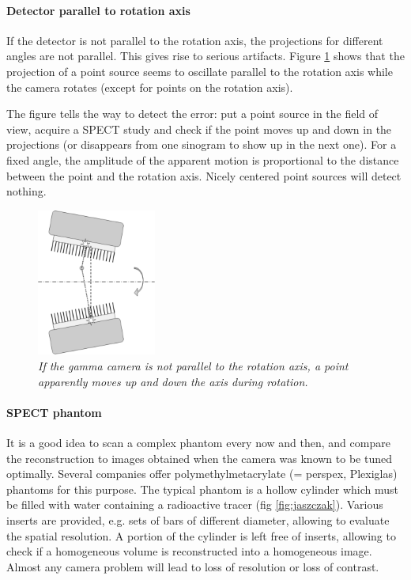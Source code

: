 \documentclass[11pt,oneside]{article}
\begin{document}
\paragraph{Detector parallel to rotation axis}
If the detector is not parallel to the rotation axis, the projections
for different angles are not parallel. This gives rise to serious
artifacts. Figure \ref{fig:gamma_parallel} shows that the projection
of a point source seems to oscillate parallel to the rotation axis
while the camera rotates (except for points on the rotation axis).

The figure tells the way to detect the error: put a point source in the field
of view, acquire a SPECT study and check if the point moves up and down in the
projections (or disappears from one sinogram to show up in the next one). For
a fixed angle, the amplitude of the apparent motion is proportional to the
distance between the point and the rotation axis. Nicely centered point
sources will detect nothing.

\begin{figure}[tb]
\centering
\includegraphics[width=0.35\textwidth]{figs/fig_gamma_parallel.pdf}
\caption{\label{fig:gamma_parallel} \emph{If the gamma camera is not parallel
to the rotation axis, a point apparently moves up and down the axis during
rotation.}}
\end{figure}


\paragraph{SPECT phantom}
It is a good idea to scan a complex phantom every now and then, and
compare the reconstruction to images obtained when the camera was
known to be tuned optimally. Several companies offer
polymethylmetacrylate (= perspex, Plexiglas) phantoms for this
purpose. The typical phantom is a hollow cylinder which must be filled
with water containing a radioactive tracer (fig
\ref{fig:jaszczak}). Various inserts are provided, e.g. sets of bars
of different diameter, allowing to evaluate the spatial resolution. A
portion of the cylinder is left free of inserts, allowing to check if
a homogeneous volume is reconstructed into a homogeneous image. Almost
any camera problem will lead to loss of resolution or loss of
contrast.
\end{document}
